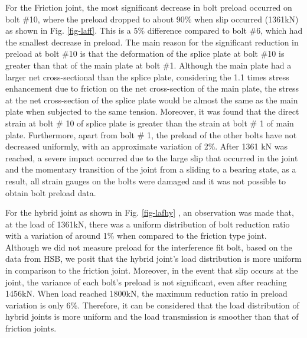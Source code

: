 For the Friction joint, the most significant decrease in bolt preload occurred on bolt \#10, where the preload dropped to about 90\% when slip occurred (1361kN) as shown in Fig. \ref{fig-laff}. This is a 5\% difference compared to bolt \#6, which had the smallest decrease in preload.  The main reason for the significant reduction in preload at bolt \#10 is that the deformation of the splice plate at bolt \#10 is greater than that of the main plate at bolt \#1. Although the main plate had a larger net cross-sectional than the splice plate, considering the 1.1 times stress enhancement due to friction on the net cross-section of the main plate, the stress at the net cross-section of the splice plate would be almost the same as the main plate when subjected to the same tension. Moreover, it was found that the direct strain at bolt \# 10 of splice plate is greater than the strain at bolt \# 1 of main plate. Furthermore, apart from bolt \# 1, the preload of the other bolts have not decreased uniformly, with an approximate variation of 2\%. After 1361 kN was reached, a severe impact occurred due to the large slip that occurred in the joint and the momentary transition of the joint from a sliding to a bearing state, as a result, all strain gauges on the bolts were damaged and it was not possible to obtain bolt preload data.

For the hybrid joint as shown in Fig. \ref{fig-lafhy} , an observation was made that, at the load of 1361kN, there was a uniform distribution of bolt reduction ratio with a variation of around 1\% when compared to the friction type joint. Although we did not measure preload for the interference fit bolt, based on the data from HSB, we posit that the hybrid joint's load distribution is more uniform in comparison to the friction joint. Moreover, in the event that slip occurs at the joint, the variance of each bolt's preload is not significant, even after reaching 1456kN. When load reached 1800kN, the maximum reduction ratio in preload variation is only 6\%. Therefore, it can be considered that the load distribution of hybrid joints is more uniform and the load transmission is smoother than that of friction joints.

